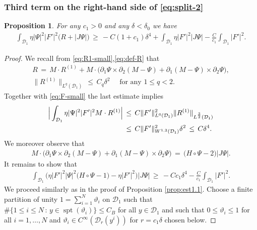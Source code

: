 \documentclass[reqno,makeidx,12pt]{amsart}
\theoremstyle{note}
\newtheorem{proposition}{Proposition}
\theoremstyle{definition}
\begin{document}
\subsubsection{Third term on the right-hand side of \eqref{eq:split-2}}
\begin{proposition}\label{prop:junk}
For any $c_1>0$ and any $\delta<\delta_0$ we have
\begin{align} \label{eq:66}
	\int_{{\mathcal{D}}_1} \eta |\Psi|^2 |F'|^2 \big( R + |J\Psi|\big)\,\geq\,  -C(1+c_1)\delta^4 + \int_{{\mathcal{D}}_1} \eta  |F'|^2|J\Psi|  - \frac{C}{c_1}  \int_{{\mathcal{D}}_1 } |F'|^2.
\end{align}
\end{proposition}
\begin{proof}
We recall from \eqref{eq:R1-small},\eqref{eq:def-R} that
\begin{gather*}
	R\,=\,  M\cdot R^{(1)}+ M\cdot \big(\partial_1\Psi\times \partial_2 (M -\Psi) +\partial_1(M-\Psi)\times\partial_2\Psi\big),\\
	\|R^{(1)}\|_{L^q({\mathcal{D}}_1)}\,\leq\, C_q \delta^2 \quad\text{ for any }1\leq q<2.
\end{gather*}
Together with \eqref{eq:F-small} the last estimate implies
\begin{align}
	\Big| \int_{{\mathcal{D}}_1} \eta |\Psi|^2 |F'|^2 M\cdot R^{(1)}\Big| \,&\leq\, C\|F'\|_{L^6({\mathcal{D}}_1)}^2 \|R^{(1)}\|_{L^{\frac{3}{2}}({\mathcal{D}}_1)} \notag\\
	&\leq\, C\|F'\|_{W^{1,2}({\mathcal{D}}_1)}^2\delta^2\,\leq\, C\delta^4. \label{eq:66bis}
\end{align}
We moreover observe that
\begin{gather*}
	M\cdot \big(\partial_1\Psi\times \partial_2 (M -\Psi) +\partial_1(M-\Psi)\times\partial_2\Psi\big) \,=\, \big(H\circ\Psi -2\big) |J\Psi|.
\end{gather*}
It remains to show that
\begin{gather}
	\int_{{\mathcal{D}}_1} \Big(\eta  |F'|^2 |\Psi|^2  \big( H\circ\Psi - 1\big) -  \eta  |F'|^2 \Big)|J\Psi| \,\geq\,  -Cc_1\delta^4    - \frac{C}{c_1}  \int_{{\mathcal{D}}_1 } |F'|^2.
	 \label{eq:R+Jac}
\end{gather}
We proceed similarly as in the proof of Proposition \ref{prop:est1.1}. Choose a finite partition of unity $1=\sum_{i=1}^N \vartheta_i$ on ${\mathcal{D}}_1$ such that  ${\#}\{1\leq i\leq N\,:\, y\in\operatorname{spt}(\vartheta_i)\}\leq C_B$ for all $y\in {\mathcal{D}}_1$ and such that $0\leq \vartheta_i\leq 1$ for all $i=1,\dots,N$ and $\vartheta_i\in C^\infty({\mathcal{D}}_r(y^i))$ for $r=c_1\delta$ chosen below. 

\end{proof}
\end{document}
